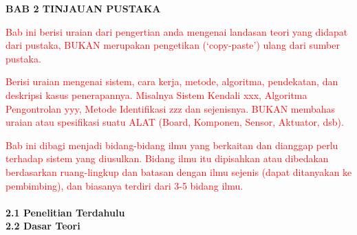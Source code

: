 \begin{spacing}{1.5}
\begin{center}
\textbf{\large BAB 2 TINJAUAN PUSTAKA}
\end{center}

\textcolor{red}{\indent Bab ini berisi uraian dari pengertian anda mengenai landasan teori yang didapat dari pustaka, BUKAN merupakan pengetikan (‘copy-paste’) ulang dari sumber pustaka.}

\medskip

\textcolor{red}{\indent Berisi uraian mengenai sistem, cara kerja, metode, algoritma, pendekatan, dan deskripsi kasus penerapannya. Misalnya Sistem Kendali xxx, Algoritma Pengontrolan yyy, Metode Identifikasi zzz dan sejenisnya. BUKAN membahas uraian atau spesifikasi suatu ALAT (Board, Komponen, Sensor, Aktuator, dsb).}

\medskip

\textcolor{red}{\indent Bab ini dibagi menjadi bidang-bidang ilmu yang berkaitan dan dianggap perlu terhadap sistem yang diusulkan. Bidang ilmu itu dipisahkan atau dibedakan berdasarkan ruang-lingkup dan batasan dengan ilmu sejenis (dapat ditanyakan ke pembimbing), dan biasanya terdiri dari 3-5 bidang ilmu.}\\
\bigskip\\
\textbf{2.1 \indent Penelitian Terdahulu}
\bigskip\\
\textbf{2.2 \indent Dasar Teori}

\end{spacing}